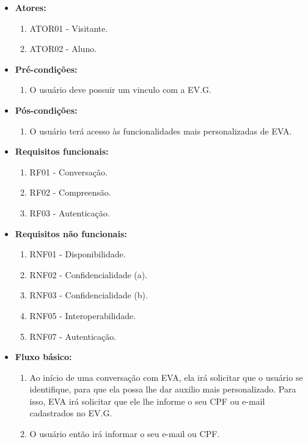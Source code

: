 \begin{itemize}
    \item \textbf{Atores:}
        \begin{enumerate}
            \item ATOR01 - Visitante.
            \item ATOR02 - Aluno.
        \end{enumerate}
    \item \textbf{Pré-condições:}
        \begin{enumerate}
            \item O usuário deve possuir um vinculo com a EV.G.
        \end{enumerate}
    \item \textbf{Pós-condições:}
        \begin{enumerate}
            \item O usuário terá acesso às funcionalidades mais personalizadas de EVA.
        \end{enumerate}
    \item \textbf{Requisitos funcionais:}
        \begin{enumerate}
            \item RF01 - Conversação.
            \item RF02 - Compreensão.
            \item RF03 - Autenticação.
        \end{enumerate}
    \item \textbf{Requisitos não funcionais:}
        \begin{enumerate}
            \item RNF01 - Disponibilidade.
            \item RNF02 - Confidencialidade (a).
            \item RNF03 - Confidencialidade (b).
            \item RNF05 - Interoperabilidade.
            \item RNF07 - Autenticação.
        \end{enumerate}
    \item \textbf{Fluxo básico:}
        \begin{enumerate}
            \item Ao início de uma conversação com EVA, ela irá solicitar que o usuário se identifique, para que ela possa lhe dar auxilio mais personalizado. Para isso, EVA irá solicitar que ele lhe informe o seu CPF ou e-mail cadastrados no EV.G.
            \item O usuário então irá informar o seu e-mail ou CPF.

\end{enumerate}
\end{itemize}
